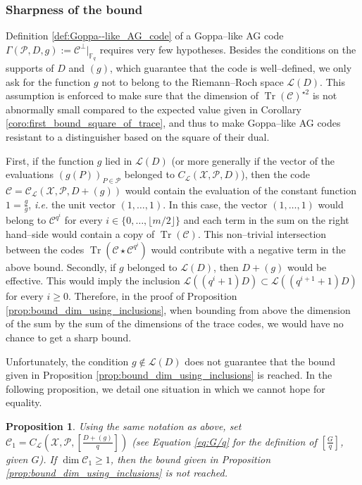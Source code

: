 \documentclass[lettersize,journal]{IEEEtran}
\theoremstyle{plain}
\newtheorem{proposition}[thm]{Proposition}
\theoremstyle{definition}
\theoremstyle{remark}
\DeclareMathOperator{\trace}{Tr}
\newcommand{\calP}{\mathcal{P}}
\newcommand{\calL}{\mathcal{L}}
\newcommand{\calC}{\mathcal{C}}
\newcommand{\calX}{\mathcal{X}}
\newcommand{\fq}{\mathbb{F}_{q}}
\newcommand{\Tr}[1]{\trace\!\left(#1\right)}
\begin{document}
	\subsubsection{Sharpness of the bound} \label{section:sharpness}
	
	Definition \ref{def:Goppa--like_AG_code} of a Goppa--like AG code $\Gamma(\calP,D,g) := \calC^{\perp}|_{\fq}$ requires very few hypotheses. Besides the conditions on the supports of $D$ and $(g)$, which guarantee that the code is well--defined, we only ask for the function $g$ not to belong to the Riemann--Roch space $\calL(D)$. This assumption is enforced to make sure that the dimension of $\Tr{\calC}^{\star 2}$ is not abnormally small compared to the expected value given in Corollary \ref{coro:first_bound_square_of_trace}, and thus to make Goppa--like AG codes resistant to a distinguisher based on the square of their dual.
	
	First, if the function $g$ lied in $\calL(D)$ (or more generally if the vector of the evaluations $(g(P))_{P \in \calP}$ belonged to $C_\calL(\calX,\calP,D)$), then the code $\calC= \calC_{\calL}(\calX,\calP,D+(g))$ would contain the evaluation of the constant function $1=\frac{g}{g}$, \textit{i.e.} the unit vector $(1,\dots,1)$. In this case, the vector $(1,\dots,1)$ would belong to $\calC^{q^i}$ for every $i \in \{0,\dots, \lfloor{m/2} \rfloor\}$ and each term in the sum on the right hand--side would contain a copy of $\Tr{\calC}$. This non--trivial intersection between the codes $\Tr{\calC\star \calC^{q^i}}$ would contribute with a negative term in the above bound.
	Secondly, if $g$ belonged to $\calL(D)$, then $D+(g)$ would be effective. This would imply the inclusion $\calL((q^i+1)D) \subset \calL((q^{i+1}+1)D)$ for every $i \geq 0$. Therefore, in the proof of Proposition \ref{prop:bound_dim_using_inclusions}, when bounding from above the dimension of the sum by the sum of the dimensions of the trace codes, we would have no chance to get a sharp bound.
	
	Unfortunately, the condition $g \notin \calL(D)$ does not guarantee that the bound given in Proposition \ref{prop:bound_dim_using_inclusions} is reached. In the following proposition, we detail one situation in which we cannot hope for equality.
	
	\begin{proposition}\label{prop:non-eq}
		Using the same notation as above, set $\calC_1=C_{\calL}\left(\calX,\mathcal{P},\left[ \frac{D+(g)}{q} \right]\right)$ (see Equation \eqref{eq:G/q} for the definition of $\left[ \frac{G}{q} \right]$, given $G$). If $\dim \calC_1 \geq 1$, then the bound given in Proposition \ref{prop:bound_dim_using_inclusions} is not reached.
	\end{proposition}
	
\end{document}
